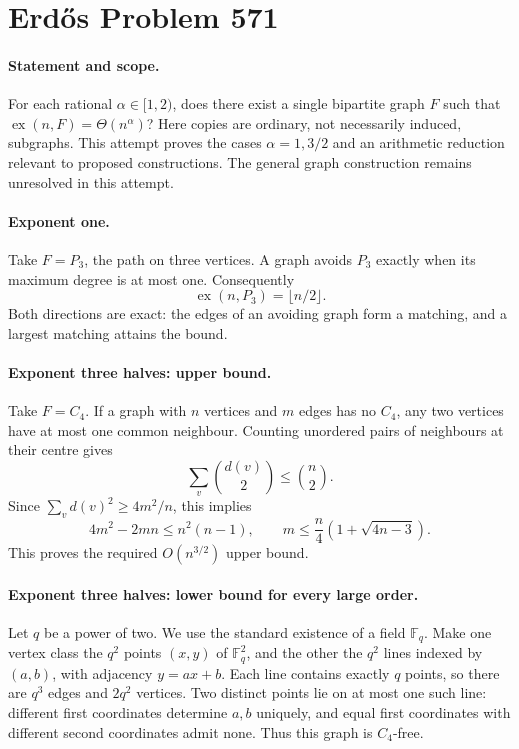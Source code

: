 \section*{Erd\H{o}s Problem 571}

\paragraph{Statement and scope.}
For each rational \(\alpha\in[1,2)\), does there exist a single bipartite graph \(F\) such that \(\operatorname{ex}(n,F)=\Theta(n^\alpha)\)? Here copies are ordinary, not necessarily induced, subgraphs. This attempt proves the cases \(\alpha=1,3/2\) and an arithmetic reduction relevant to proposed constructions. The general graph construction remains unresolved in this attempt.

\paragraph{Exponent one.}
Take \(F=P_3\), the path on three vertices. A graph avoids \(P_3\) exactly when its maximum degree is at most one. Consequently
\[
 \operatorname{ex}(n,P_3)=\lfloor n/2\rfloor.
\]
Both directions are exact: the edges of an avoiding graph form a matching, and a largest matching attains the bound.

\paragraph{Exponent three halves: upper bound.}
Take \(F=C_4\). If a graph with \(n\) vertices and \(m\) edges has no \(C_4\), any two vertices have at most one common neighbour. Counting unordered pairs of neighbours at their centre gives
\[
 \sum_v\binom{d(v)}2\leq\binom n2.
\]
Since \(\sum_v d(v)^2\geq4m^2/n\), this implies
\[
 4m^2-2mn\leq n^2(n-1),\qquad
 m\leq\frac n4(1+\sqrt{4n-3}). \tag{1}
\]
This proves the required \(O(n^{3/2})\) upper bound.

\paragraph{Exponent three halves: lower bound for every large order.}
Let \(q\) be a power of two. We use the standard existence of a field \(\mathbb F_q\). Make one vertex class the \(q^2\) points \((x,y)\) of \(\mathbb F_q^2\), and the other the \(q^2\) lines indexed by \((a,b)\), with adjacency \(y=ax+b\). Each line contains exactly \(q\) points, so there are \(q^3\) edges and \(2q^2\) vertices. Two distinct points lie on at most one such line: different first coordinates determine \(a,b\) uniquely, and equal first coordinates with different second coordinates admit none. Thus this graph is \(C_4\)-free.

